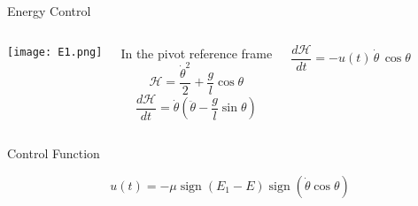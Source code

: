 \documentclass{beamer}
\newcommand{\sign}{\mathop{\mathrm{sign}}}
\begin{document}
\begin{frame}[t]{Energy Control}

\begin{columns} 
      \centering
      \texttt{[image: E1.png]}

      In the pivot reference frame
      \begin{equation}
    \mathcal{H}=\frac{\dot{\theta}^2}{2}+ \frac{g}{l}\cos{\theta}
  \end{equation}
  \vspace{0.5 cm}
\begin{equation}
 \frac{d\mathcal{H}}{dt}=\dot{\theta}\left(\ddot{\theta}-\frac{g}{l}\sin{\theta}\right)
\end{equation}

\begin{equation}
    \frac{d\mathcal{H}}{dt}=-u(t) \,\dot{\theta}\,\cos{\theta}
    \label{control1d}
\end{equation}
\end{columns}
\begin{block}{Control Function}

  \begin{equation}
    u(t)=-\mu  \sign\left({E_1-E}\right) \sign(\dot{\theta} \cos{\theta})
 \label{u1d}
\end{equation}
\end{block}

\end{frame}

\end{document}
